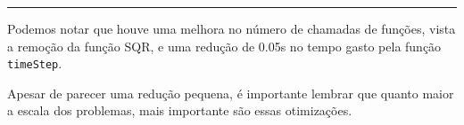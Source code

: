 \documentclass[a4paper,twosidep]{article}
\begin{document}
\noindent\rule{\textwidth}{0.5pt}

Podemos notar que houve uma melhora no número de chamadas de funções, vista a remoção da função SQR, e uma redução de 0.05s no tempo gasto pela função \texttt{timeStep}.

Apesar de parecer uma redução pequena, é importante lembrar que quanto maior a escala dos problemas, mais importante são essas otimizações.
\end{document}
